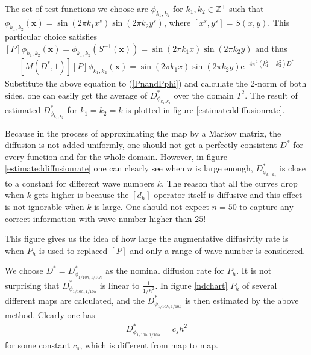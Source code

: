 \documentclass{article}
\begin{document}
The set of test functions we choose are $\phi_{k_1,k_2}$ for
$k_1,k_2\in \mathbb{Z}^+$ such that $\phi_{k_1,k_2}(\mathbf{x}) =
\sin(2\pi k_1 x^s)\sin(2 \pi k_2 y^s)$, where $[x^s , y^s]=S(x,y)$.
This particular choice satisfies $[P]\phi_{k_1,k_2}(\mathbf{x})=
\phi_{k_1,k_2}(S^{-1}(\mathbf{x})) = \sin(2\pi k_1 x)\sin(2 \pi k_2
y)$ and thus
\begin{eqnarray}
\label{MPphi}
 [M(D^*,1)][P]\phi_{k_1,k_2}(\mathbf{x}) = \sin(2\pi k_1 x)\sin(2 \pi k_2
y)\text{e}^{-4 \pi^2 (k_1^2+k_2^2)D^*}
\end{eqnarray}
Substitute the above equation to (\ref{PnandPphi}) and calculate the
2-norm of both sides, one can easily get the average of
$D^*_{\phi_{k_1,k_2}}$ over the domain $T^2$. The result of
estimated $D^*_{\phi_{k_1,k_2}}$ for $k_1=k_2 = k$ is plotted in
figure \ref{estimateddiffusionrate}.

Because in the process of approximating the map by a Markov matrix,
the diffusion is not added uniformly, one should not get a perfectly
consistent $D^*$ for every function and for the whole domain.
However, in figure \ref{estimateddiffusionrate} one can clearly see
when $n$ is large enough, $D^*_{\phi_{k_1,k_2}}$ is close to a
constant for different wave numbers $k$. The reason that all the
curves drop when $k$ gets higher is because the $[d_h]$ operator
itself is diffusive and this effect is not ignorable when $k$ is
large. One should not expect $n=50$ to capture any correct
information with wave number higher than $25$!

This figure gives us the idea of how large the augmentative
diffusivity rate is when $P_h$ is used to replaced $[P]$ and only a
range of wave number is considered.

We choose $D^* = D^*_{\phi_{1/10h,1/10h}}$ as the nominal diffusion
rate for $P_h$. It is not surprising that $D^*_{\phi_{1/10h,1/10h}}$
is linear to $\frac{1}{1/h^2}$. In figure \ref{ndchart} $P_h$ of
several different maps are calculated, and the
$D^*_{\phi_{1/10h,1/10h}}$ is then estimated by the above method.
Clearly one has
\begin{eqnarray}
\label{MPphi} D^*_{\phi_{1/10h,1/10h}} = c_s h^2
\end{eqnarray}
for some constant $c_s$, which is different from map to map.




\end{document}
